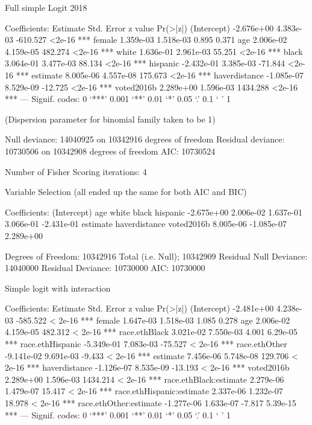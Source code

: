 Full simple Logit 2018

Coefficients:
                Estimate Std. Error  z value Pr(>|z|)
(Intercept)   -2.676e+00  4.383e-03 -610.527   <2e-16 ***
female         1.359e-03  1.518e-03    0.895    0.371
age            2.006e-02  4.159e-05  482.274   <2e-16 ***
white          1.636e-01  2.961e-03   55.251   <2e-16 ***
black          3.064e-01  3.477e-03   88.134   <2e-16 ***
hispanic      -2.432e-01  3.385e-03  -71.844   <2e-16 ***
estimate       8.005e-06  4.557e-08  175.673   <2e-16 ***
haverdistance -1.085e-07  8.529e-09  -12.725   <2e-16 ***
voted2016b     2.289e+00  1.596e-03 1434.288   <2e-16 ***
---
Signif. codes:  0 ‘***’ 0.001 ‘**’ 0.01 ‘*’ 0.05 ‘.’ 0.1 ‘ ’ 1

(Dispersion parameter for binomial family taken to be 1)

    Null deviance: 14040925  on 10342916  degrees of freedom
Residual deviance: 10730506  on 10342908  degrees of freedom
AIC: 10730524

Number of Fisher Scoring iterations: 4





Variable Selection (all ended up the same for both AIC and BIC)


Coefficients:
  (Intercept)            age          white          black       hispanic
   -2.675e+00      2.006e-02      1.637e-01      3.066e-01     -2.431e-01
     estimate  haverdistance     voted2016b
    8.005e-06     -1.085e-07      2.289e+00

Degrees of Freedom: 10342916 Total (i.e. Null);  10342909 Residual
Null Deviance:	    14040000
Residual Deviance: 10730000 	AIC: 10730000





Simple logit with interaction


Coefficients:
                            Estimate Std. Error  z value Pr(>|z|)
(Intercept)               -2.481e+00  4.238e-03 -585.522  < 2e-16 ***
female                     1.647e-03  1.518e-03    1.085    0.278
age                        2.006e-02  4.159e-05  482.312  < 2e-16 ***
race.ethBlack              3.021e-02  7.550e-03    4.001 6.29e-05 ***
race.ethHispanic          -5.349e-01  7.083e-03  -75.527  < 2e-16 ***
race.ethOther             -9.141e-02  9.691e-03   -9.433  < 2e-16 ***
estimate                   7.456e-06  5.748e-08  129.706  < 2e-16 ***
haverdistance             -1.126e-07  8.535e-09  -13.193  < 2e-16 ***
voted2016b                 2.289e+00  1.596e-03 1434.214  < 2e-16 ***
race.ethBlack:estimate     2.279e-06  1.479e-07   15.417  < 2e-16 ***
race.ethHispanic:estimate  2.337e-06  1.232e-07   18.978  < 2e-16 ***
race.ethOther:estimate    -1.277e-06  1.633e-07   -7.817 5.39e-15 ***
---
Signif. codes:  0 ‘***’ 0.001 ‘**’ 0.01 ‘*’ 0.05 ‘.’ 0.1 ‘ ’ 1

